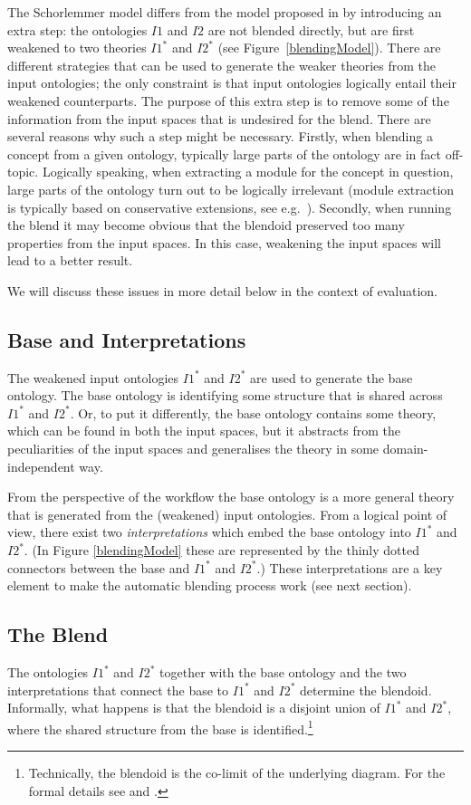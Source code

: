 \documentclass[letterpaper]{article}
\begin{document}
The Schorlemmer model differs from the model proposed in  \cite{goguenharrell10} by introducing an extra step:
 the ontologies  $I1$ and $I2$ are not blended directly, but are first weakened to two theories 
 $I1^*$ and $I2^*$ (see Figure~\ref{blendingModel}).  There are different strategies that can be used to generate  the weaker theories
  from the input ontologies; the only constraint is that input ontologies logically entail their weakened 
  counterparts. The purpose of this extra step is to remove some of the information from the input spaces 
  that is undesired for the blend. There are several reasons why such a step might be necessary. Firstly, when blending a concept from a given ontology, typically large parts of the ontology are in fact off-topic. Logically speaking, when extracting a module for the concept in question, large parts of the ontology turn out to be logically irrelevant (module extraction is typically based on conservative extensions, see e.g.\ \cite{KLWW-ECAI-08}). Secondly, when running the blend it may become obvious that the blendoid preserved too many properties from the input spaces. In this case,  weakening the input spaces will lead to a better result. 
  
  \smallskip\noindent
  We will discuss these issues in more detail below in the context of evaluation. 

\subsection{Base and Interpretations}
The weakened input ontologies $I1^*$ and $I2^*$ are used to generate the base ontology. 
The base ontology is identifying some structure that is shared across $I1^*$ and $I2^*$.
 Or, to put it differently, the base ontology contains some theory, which can be found in
  both the input spaces, but it abstracts from the peculiarities of the input spaces and generalises the theory in some domain-independent way. 

From the perspective of the workflow the base ontology is a more general theory that
 is generated  from the (weakened) input ontologies. From a logical point of view, 
 there exist two \emph{interpretations} which embed the base ontology into  $I1^*$ 
 and $I2^*$. (In Figure \ref{blendingModel} these are represented by the thinly dotted 
 connectors between the base and  $I1^*$ and $I2^*$.) These interpretations are a key 
 element to make the automatic blending process work (see next section). 

\subsection{The Blend} 
The ontologies  $I1^*$ and $I2^*$ together with the base ontology and the two
  interpretations that connect the base to  $I1^*$ and $I2^*$ determine the blendoid. 
  Informally, what happens is that the blendoid is a disjoint union of $I1^*$ and $I2^*$, 
  where the shared structure from  the base is identified.\footnote{Technically, the 
  blendoid is the co-limit of the underlying diagram. For the formal details see \cite{AHS} and \cite{blendingc3gi12}.}
\end{document}
